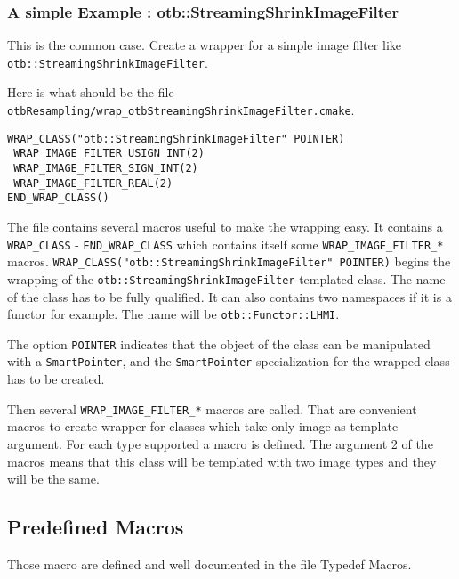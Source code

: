 \subsubsection{A simple Example : otb::StreamingShrinkImageFilter}
This is the common case. Create a wrapper for a 
simple image filter like 
\verb$otb::StreamingShrinkImageFilter$. 

Here is what should be the file 
\verb$otbResampling/wrap_otbStreamingShrinkImageFilter.cmake$.

\small
\begin{verbatim}
WRAP_CLASS("otb::StreamingShrinkImageFilter" POINTER)
 WRAP_IMAGE_FILTER_USIGN_INT(2)
 WRAP_IMAGE_FILTER_SIGN_INT(2)
 WRAP_IMAGE_FILTER_REAL(2)
END_WRAP_CLASS()
\end{verbatim}
\normalsize

The file contains several macros useful to make the wrapping easy. It contains 
a \verb$WRAP_CLASS$ - \verb$END_WRAP_CLASS$ which contains itself some 
\verb$WRAP_IMAGE_FILTER_*$ macros. 
\verb$WRAP_CLASS("otb::StreamingShrinkImageFilter" POINTER)$ begins the wrapping of the 
\verb$otb::StreamingShrinkImageFilter$ templated class.
The name of the class has to be fully qualified.  It can also contains two namespaces if it is 
a functor for example. The name will be \verb$otb::Functor::LHMI$.

The option \verb$POINTER$ indicates that the object of the class can be manipulated with a 
\verb$SmartPointer$, and the  \verb$SmartPointer$ specialization for the wrapped class has to be created.

Then several \verb$WRAP_IMAGE_FILTER_*$ macros are called. That are convenient macros to create
wrapper for classes which take only image as template argument. For each type supported  
a macro is defined. The argument 2 of the macros means that this class will be templated with 
two image types and they will be the same.


\subsection{Predefined Macros}

Those macro are defined and well documented in the file Typedef Macros.

